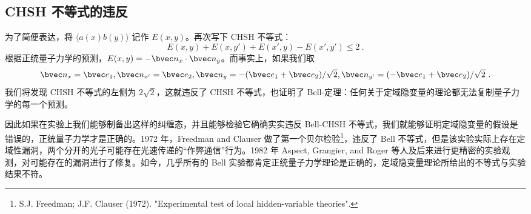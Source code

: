 \subsection{CHSH 不等式的违反}
为了简便表达，将 $\langle a(x)b(y)\rangle$ 记作 $E(x,y)$。再次写下 CHSH 不等式：
\begin{equation}
E(x,y)+E(x,y')+E(x',y)-E(x',y')\le 2~.
\end{equation}
根据正统量子力学的预测，$E(x,y)=-\bvec n_x\cdot \bvec n_y$。而事实上，如果我们取
\begin{equation}
\bvec n_x=\bvec e_1,
\bvec n_{x'}=\bvec e_2,
\bvec n_y=-(\bvec e_1+\bvec e_2)/\sqrt{2},
\bvec n_{y'}=(-\bvec e_1+\bvec e_2)/\sqrt{2}~.
\end{equation}
我们将发现 CHSH 不等式的左侧为 $2\sqrt{2}$，这就违反了 CHSH 不等式，也证明了 Bell-定理：任何关于定域隐变量的理论都无法复制量子力学的每一个预测。

因此如果在实验上我们能够制备出这样的纠缠态，并且能够检验它确确实实违反 Bell-CHSH 不等式，我们就能够证明定域隐变量的假设是错误的，正统量子力学才是正确的。1972 年，Freedman and Clauser 做了第一个贝尔检验\footnote{S.J. Freedman; J.F. Clauser (1972). "Experimental test of local hidden-variable theories".}，违反了 Bell 不等式，但是该实验实际上存在定域性漏洞，两个分开的光子可能存在光速传递的“作弊通信”行为。1982 年 Aspect, Grangier, and Roger 等人及后来进行更精密的实验观测，对可能存在的漏洞进行了修复。如今，几乎所有的 Bell 实验都肯定正统量子力学理论是正确的，定域隐变量理论所给出的不等式与实验结果不符。
